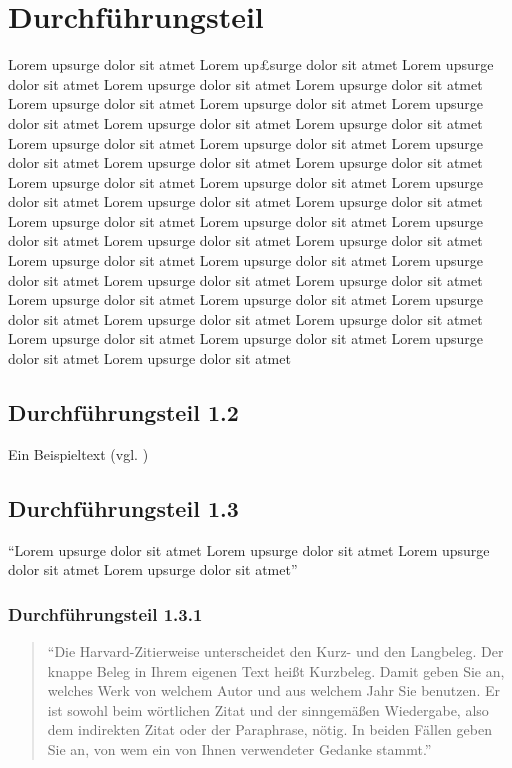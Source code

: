 \section{Durchführungsteil}

Lorem upsurge dolor sit atmet Lorem up£surge dolor sit atmet Lorem upsurge dolor sit atmet Lorem upsurge dolor sit atmet Lorem upsurge dolor sit atmet Lorem upsurge dolor sit atmet Lorem upsurge dolor sit atmet Lorem upsurge dolor sit atmet Lorem upsurge dolor sit atmet Lorem upsurge dolor sit atmet Lorem upsurge dolor sit atmet Lorem upsurge dolor sit atmet Lorem upsurge dolor sit atmet Lorem upsurge dolor sit atmet Lorem upsurge dolor sit atmet Lorem upsurge dolor sit atmet Lorem upsurge dolor sit atmet Lorem upsurge dolor sit atmet Lorem upsurge dolor sit atmet Lorem upsurge dolor sit atmet Lorem upsurge dolor sit atmet Lorem upsurge dolor sit atmet Lorem upsurge dolor sit atmet Lorem upsurge dolor sit atmet Lorem upsurge dolor sit atmet Lorem upsurge dolor sit atmet Lorem upsurge dolor sit atmet Lorem upsurge dolor sit atmet Lorem upsurge dolor sit atmet Lorem upsurge dolor sit atmet Lorem upsurge dolor sit atmet Lorem upsurge dolor sit atmet Lorem upsurge dolor sit atmet Lorem upsurge dolor sit atmet Lorem upsurge dolor sit atmet Lorem upsurge dolor sit atmet Lorem upsurge dolor sit atmet Lorem upsurge dolor sit atmet Lorem upsurge dolor sit atmet 

\subsection{Durchführungsteil 1.2}
Ein Beispieltext (vgl. \cite{samplebook})
\subsection{Durchführungsteil 1.3}
\enquote{Lorem upsurge dolor sit atmet Lorem upsurge dolor sit atmet Lorem upsurge dolor sit atmet Lorem upsurge dolor sit atmet} \parencite[S. 55]{sample:2}
\subsubsection{Durchführungsteil 1.3.1}
\blockquote{\enquote{Die Harvard-Zitierweise unterscheidet den Kurz- und den Langbeleg. Der knappe Beleg in Ihrem eigenen Text heißt Kurzbeleg. Damit geben Sie an, welches Werk von welchem Autor und aus welchem Jahr Sie benutzen. Er ist sowohl beim wörtlichen Zitat und der sinngemäßen Wiedergabe, also dem indirekten Zitat oder der Paraphrase, nötig. In beiden Fällen geben Sie an, von wem ein von Ihnen verwendeter Gedanke stammt.} \parencite{samplesite:2021}}